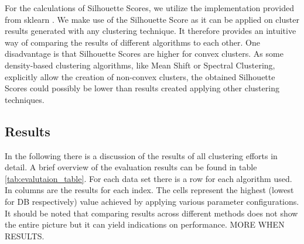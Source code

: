 For the calculations of Silhouette Scores, we utilize the implementation provided from sklearn \cite{sklearn_api}.
We make use of the Silhouette Score as it can be applied on cluster results generated with any clustering technique. It therefore provides an intuitive way of comparing the results of different algorithms to each other. One disadvantage is that Silhouette Scores are higher for convex clusters. As some density-based clustering algorithms, like Mean Shift or Spectral Clustering, explicitly allow the creation of non-convex clusters, the obtained Silhouette Scores could possibly be lower than results created applying other clustering techniques.

\subsection{Results}

In the following there is a discussion of the results of all clustering efforts in detail. A brief overview of the evaluation results can be found in table \ref{tab:evalutaion_table}. For each data set there is a row for each algorithm used. In columns are the results for each index. The cells represent the highest (lowest for \gls{DB} respectively) value achieved by applying various parameter configurations. It should be noted that comparing results across different methods does not show the entire picture but it can yield indications on performance. MORE WHEN RESULTS.

